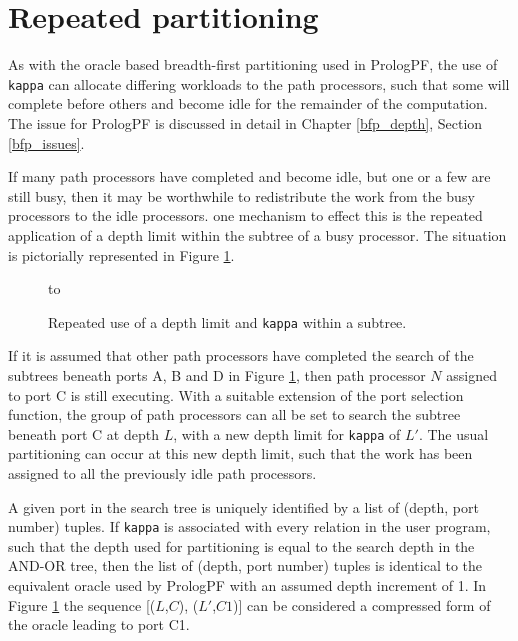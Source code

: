 \section{Repeated partitioning} %

As with the oracle based breadth-first partitioning used in PrologPF, the use
of \texttt{kappa} can allocate differing workloads to the path processors, such that
some will complete before others and become idle for the remainder of the
computation.  The issue for PrologPF is discussed in detail in Chapter \ref{bfp_depth},
Section \ref{bfp_issues}.

If many path processors have completed and become idle, but one or a few are still
busy, then it may be worthwhile to redistribute the work from the busy processors to
the idle processors.  one mechanism to effect this is the repeated application of a
depth limit within the subtree of a busy processor.  The situation is pictorially
represented in Figure \ref{repeat_kappa}.

\begin{figure}[htb]
\vspace{5mm} \hbox to 
\caption{Repeated use of a depth limit and \texttt{kappa} within a subtree.}
\vspace{5mm}
\label{repeat_kappa}
\end{figure}

If it is assumed that other path processors have completed the search of the 
subtrees beneath ports A, B and D in Figure \ref{repeat_kappa}, then path
processor $N$ assigned to port C is still executing.  With a suitable extension
of the port selection function, the group of path processors can all be
set to search the subtree beneath port C at depth $L$,
with a new depth limit for \texttt{kappa} of $L'$.  The usual partitioning can occur at
this new depth limit, such that the work has been assigned to all the previously
idle path processors.

A given port in the search tree is uniquely identified by a list of (depth, port number)
tuples.  If \texttt{kappa} is associated with every relation in the user program, such that
the depth used for partitioning is equal to the search depth in the AND-OR tree, then
the list of (depth, port number) tuples is identical to the equivalent oracle used by
PrologPF with an assumed depth increment of 1.  In Figure \ref{repeat_kappa} the
sequence [($L$,$C$), ($L'$,$C1$)]
can be considered a compressed form of the oracle leading to port C1.

